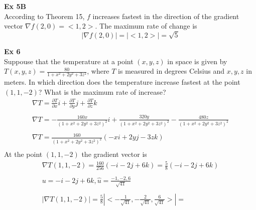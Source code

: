 \documentclass{article}
\begin{document}
    \textbf{Ex 5B}\\
    According to Theorem 15, $ f $ increases fastest in the direction of the gradient vector $ \nabla f(2,0)=< 1, 2 >  $. The maximum rate of change is
    \[
        | \nabla f(2,0) | = | < 1, 2 >  | = \boxed{\sqrt{5}}
    \]

    \textbf{Ex 6}\\
    Suppouse that the temperature at a point $ (x,y,z) $ in space is given by $ T(x,y,z) = \frac{80}{1+x^{2}+2y^{2}+3z^{2}} $, where $ T $ is measured in degrees Celsius and $ x,y, z $ in meters. In which direction does the temperature increase fastest at the point $ (1,1,-2) $? What is the maximum rate of increase? 
    \[
        \begin{gathered}
        \nabla T = \frac{\partial T}{\partial x}i + \frac{\partial T}{\partial y}j + \frac{\partial T}{\partial z}k\\
        ~\\
        \nabla T = - \frac{160x}{(1+x^{2}+2y^{2}+3z^{2})^{2}}i+\frac{320y}{(1+x^{2}+2y^{2}+3z^{2})^{2}}-\frac{480z}{(1+x^{2}+2y^{2}+3z^{2})^{2}}\\
        ~\\
        \nabla T=\frac{160}{(1+x^{2}+2y^{2}+3z^{2})^{2}}(-xi+2yj-3zk)\\
        \end{gathered}
    \]
    At the point $(1,1,-2) $ the gradient vector is
    \[
        \begin{gathered}
        \nabla T(1,1,-2)=\frac{160}{256}(-i-2j+6k)=\frac{5}{8}(-i-2j+6k)\\
        ~\\
        u = -i-2j+6k, \hat{u}=\frac{-1,-2,6}{\sqrt{41} }\\
        ~\\
        | \nabla T(1,1,-2) | = \frac{5}{8} | < -\frac{1}{\sqrt{41} } , -\frac{2}{\sqrt{41} } ,  \frac{6}{\sqrt{41} } > |=  
        \end{gathered}
    \]
\end{document}
